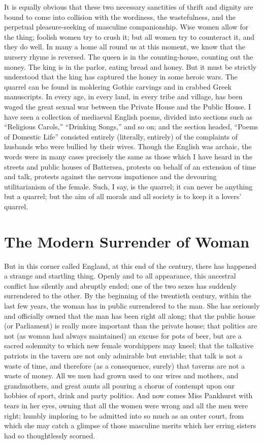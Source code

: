 \documentclass{book}
\begin{document}
It is equally obvious that these two necessary sanctities of thrift and dignity are bound to come into collision with the wordiness, the wastefulness, and the perpetual pleasure-seeking of masculine companionship. Wise women allow for the thing; foolish women try to crush it; but all women try to counteract it, and they do well. In many a home all round us at this moment, we know that the nursery rhyme is reversed. The queen is in the counting-house, counting out the money. The king is in the parlor, eating bread and honey. But it must be strictly understood that the king has captured the honey in some heroic wars. The quarrel can be found in moldering Gothic carvings and in crabbed Greek manuscripts. In every age, in every land, in every tribe and village, has been waged the great sexual war between the Private House and the Public House. I have seen a collection of mediaeval English poems, divided into sections such as “Religious Carols,” “Drinking Songs,” and so on; and the section headed, “Poems of Domestic Life” consisted entirely (literally, entirely) of the complaints of husbands who were bullied by their wives. Though the English was archaic, the words were in many cases precisely the same as those which I have heard in the streets and public houses of Battersea, protests on behalf of an extension of time and talk, protests against the nervous impatience and the devouring utilitarianism of the female. Such, I say, is the quarrel; it can never be anything but a quarrel; but the aim of all morals and all society is to keep it a lovers’ quarrel.

\chapter{The Modern Surrender of Woman}
\label{chapter-25}
But in this corner called England, at this end of the century, there has happened a strange and startling thing. Openly and to all appearance, this ancestral conflict has silently and abruptly ended; one of the two sexes has suddenly surrendered to the other. By the beginning of the twentieth century, within the last few years, the woman has in public surrendered to the man. She has seriously and officially owned that the man has been right all along; that the public house (or Parliament) is really more important than the private house; that politics are not (as woman had always maintained) an excuse for pots of beer, but are a sacred solemnity to which new female worshippers may kneel; that the talkative patriots in the tavern are not only admirable but enviable; that talk is not a waste of time, and therefore (as a consequence, surely) that taverns are not a waste of money. All we men had grown used to oar wires and mothers, and grandmothers, and great aunts all pouring a chorus of contempt upon our hobbies of sport, drink and party politics. And now comes Miss Pankhurst with tears in her eyes, owning that all the women were wrong and all the men were right; humbly imploring to be admitted into so much as an outer court, from which she may catch a glimpse of those masculine merits which her erring sisters had so thoughtlessly scorned.
\end{document}
